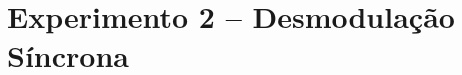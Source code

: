 \documentclass[12pt,addpoints]{exam}
\begin{document}
\begin{questions}

    
    
    
 

\end{questions}

\section*{Experimento 2 -- Desmodulação Síncrona}
\end{document}
